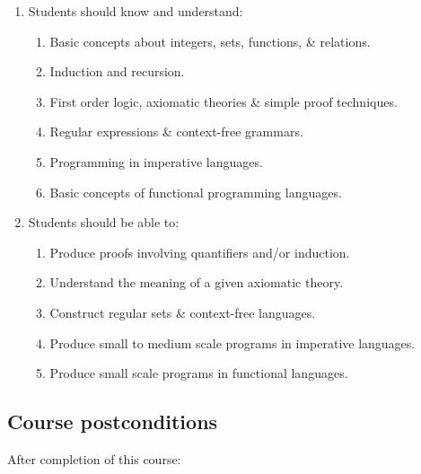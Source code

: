 \documentclass[11pt]{article}
\begin{document}
\begin{enumerate}
\item Students should know and understand:
\begin{enumerate}
\item Basic concepts about integers, sets, functions, \& relations.
\item Induction and recursion.
\item First order logic, axiomatic theories \& simple proof techniques.
\item Regular expressions \& context-free grammars.
\item Programming in imperative languages.
\item Basic concepts of functional programming languages.
\end{enumerate}
\item Students should be able to:
\begin{enumerate}
\item Produce proofs involving quantifiers and/or induction.
\item Understand the meaning of a given axiomatic theory.
\item Construct regular sets \& context-free languages.
\item Produce small to medium scale programs in imperative languages.
\item Produce small scale programs in functional languages.
\end{enumerate}
\end{enumerate}

\subsection{Course postconditions}
\label{sec:org00be7e0}
After completion of this course:
\end{document}
